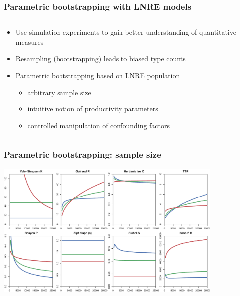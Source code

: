 \documentclass[t]{beamer} %
\begin{document}
\begin{frame}
  \frametitle{Parametric bootstrapping with LNRE models}

  \begin{columns}[T]
    \begin{column}{55mm}
      \begin{itemize}
      \item Use simulation experiments to gain better understanding of quantitative measures
      \item Resampling (bootstrapping) leads to biased type counts
      \item<2->[\So] Parametric bootstrapping based on LNRE population
        \begin{itemize}
        \item arbitrary sample size
        \item intuitive notion of productivity \so parameters 
        \item controlled manipulation of confounding factors
        \end{itemize}
      \end{itemize}
    \end{column}
    \begin{column}{45mm}
    \end{column}
  \end{columns}
\end{frame}

\begin{frame}[c]
  \frametitle{Parametric bootstrapping: sample size}
  
  \centering
  \includegraphics[width=11cm]{img/lexconst_sample_size}
\end{frame}
\end{document}
